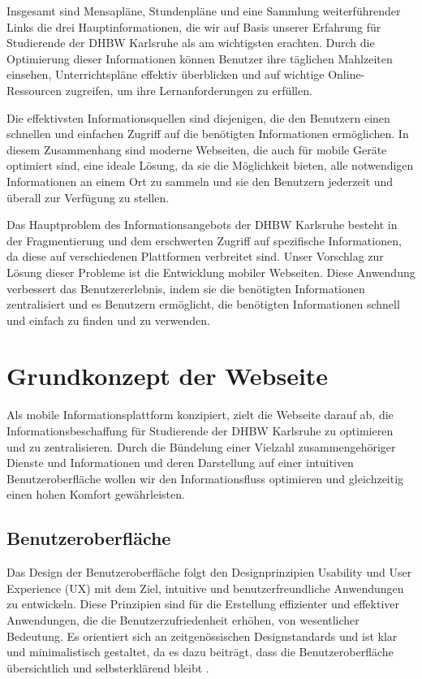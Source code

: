 Insgesamt sind Mensapläne, Stundenpläne und eine Sammlung weiterführender Links die drei Hauptinformationen, die wir auf Basis unserer Erfahrung für Studierende der DHBW Karlsruhe als am wichtigsten erachten. Durch die Optimierung dieser Informationen können Benutzer ihre täglichen Mahlzeiten einsehen, Unterrichtspläne effektiv überblicken und auf wichtige Online-Ressourcen zugreifen, um ihre Lernanforderungen zu erfüllen.

Die effektivsten Informationsquellen sind diejenigen, die den Benutzern einen schnellen und einfachen Zugriff auf die benötigten Informationen ermöglichen. In diesem Zusammenhang sind moderne Webseiten, die auch für mobile Geräte optimiert sind, eine ideale Lösung, da sie die Möglichkeit bieten, alle notwendigen Informationen an einem Ort zu sammeln und sie den Benutzern jederzeit und überall zur Verfügung zu stellen.

Das Hauptproblem des Informationsangebots der DHBW Karlsruhe besteht in der Fragmentierung und dem erschwerten Zugriff auf spezifische Informationen, da diese auf verschiedenen Plattformen verbreitet sind. Unser Vorschlag zur Lösung dieser Probleme ist die Entwicklung mobiler Webseiten. Diese Anwendung verbessert das Benutzererlebnis, indem sie die benötigten Informationen zentralisiert und es Benutzern ermöglicht, die benötigten Informationen schnell und einfach zu finden und zu verwenden.

\newpage
\section{Grundkonzept der Webseite}
Als mobile Informationsplattform konzipiert, zielt die Webseite darauf ab, die Informationsbeschaffung für Studierende der DHBW Karlsruhe zu optimieren und zu zentralisieren. Durch die Bündelung einer Vielzahl zusammengehöriger Dienste und Informationen und deren Darstellung auf einer intuitiven Benutzeroberfläche wollen wir den Informationsfluss optimieren und gleichzeitig einen hohen Komfort gewährleisten.

\subsection{Benutzeroberfläche}
Das Design der Benutzeroberfläche folgt den Designprinzipien Usability und User Experience (UX) mit dem Ziel, intuitive und benutzerfreundliche Anwendungen zu entwickeln\cite{hartmann2017usability}. Diese Prinzipien sind für die Erstellung effizienter und effektiver Anwendungen, die die Benutzerzufriedenheit erhöhen, von wesentlicher Bedeutung\cite{14all}. Es orientiert sich an zeitgenössischen Designstandards und ist klar und minimalistisch gestaltet, da es dazu beiträgt, dass die Benutzeroberfläche übersichtlich und selbsterklärend bleibt \cite{massiveart}.

